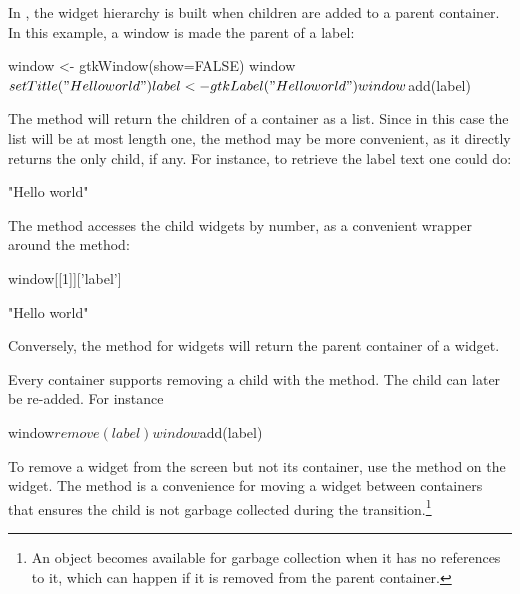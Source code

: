 In \GTK{}, the widget hierarchy is built
when children are added to a parent container.  In this example, a
window is made the parent of a label:
\begin{Schunk}
\begin{Sinput}
 window <- gtkWindow(show=FALSE)
 window$setTitle("Hello world")
 label <- gtkLabel("Hello world")
 window$add(label)
\end{Sinput}
\end{Schunk}

The method  will return the children
of a container as a list. Since in this case the list will be at most
length one, the  method may be more
convenient, as it directly returns the only child, if any. For
instance, to retrieve the label text one could do:
\begin{Schunk}
\begin{Soutput}
[1] "Hello world"
\end{Soutput}
\end{Schunk}
The \method{[[}{GObject} method 
accesses the child widgets by number, as a convenient wrapper
around the  method:
\begin{Schunk}
\begin{Sinput}
 window[[1]]['label']
\end{Sinput}
\begin{Soutput}
[1] "Hello world"
\end{Soutput}
\end{Schunk}
%
Conversely, the  method for \GTK\/ widgets will
return the parent container of a widget.

Every container supports removing a child with the
 method. The child can later be re-added.
For instance
\begin{Schunk}
\begin{Sinput}
 window$remove(label)
 window$add(label)
\end{Sinput}
\end{Schunk}
% 
To remove a widget from the screen but not its container, use the
 method on the widget. The
 method is a convenience for moving a
widget between containers that ensures the child is not
garbage
collected during the transition.\footnote{An object becomes available
  for garbage collection when it has no references to it, which can
  happen if it is removed from the parent container.}

